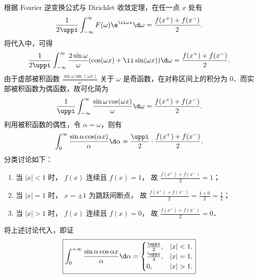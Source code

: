 \begin{solution}
    根据 Fourier 逆变换公式与 Dirichlet 收敛定理，在任一点 $x$ 处有
    \begin{equation}\label{eq:inv-conv-3}
        \frac{1}{2\uppi} \int_{-\infty}^{\infty} F(\omega) \e^{\ii\omega x} \d\omega = \frac{f(x^+) + f(x^-)}{2}.
    \end{equation}
    将代入中，可得
    \begin{equation}\label{eq:sub-4}
        \frac{1}{2\uppi} \int_{-\infty}^{\infty} \frac{2\sin\omega}{\omega} (\cos(\omega x) + \ii\sin(\omega x)) \d\omega = \frac{f(x^+) + f(x^-)}{2}.
    \end{equation}
    由于虚部被积函数 $\frac{\sin\omega \sin(\omega x)}{\omega}$ 关于 $\omega$ 是奇函数，在对称区间上的积分为 $0$．而实部被积函数为偶函数，故可化简为
    \begin{equation}\label{eq:even-int-5}
        \frac{1}{\uppi} \int_{-\infty}^{\infty} \frac{\sin\omega \cos(\omega x)}{\omega} \d\omega = \frac{f(x^+) + f(x^-)}{2}.
    \end{equation}
    利用被积函数的偶性，令 $\alpha = \omega$，则有
    \begin{equation}\label{eq:alpha-int-6}
        \int_0^\infty \frac{\sin\alpha \cos(\alpha x)}{\alpha} \d\alpha = \frac{\uppi}{2} \cdot \frac{f(x^+) + f(x^-)}{2}.
    \end{equation}
    分类讨论如下：
    \begin{enumerate}
        \item 当 $|x| < 1$ 时， $f(x)$ 连续且 $f(x) = 1$， 故 $\frac{f(x^+) + f(x^-)}{2} = 1$；
        \item 当 $|x| = 1$ 时， $x = \pm 1$ 为跳跃间断点， 故 $\frac{f(x^+) + f(x^-)}{2} = \frac{1+0}{2} = \frac{1}{2}$；
        \item 当 $|x| > 1$ 时， $f(x)$ 连续且 $f(x) = 0$， 故 $\frac{f(x^+) + f(x^-)}{2} = 0$．
    \end{enumerate}
    将上述讨论代入，即证
    \begin{equation}
        \boxed{\int_{0}^{+\infty} \frac{\sin \alpha \cos \alpha x}{\alpha} \d\alpha = \begin{cases} \frac{\uppi}{2}, & |x| < 1, \\ \frac{\uppi}{4}, & |x| = 1, \\ 0, & |x| > 1. \end{cases}}
    \end{equation}
\end{solution}


